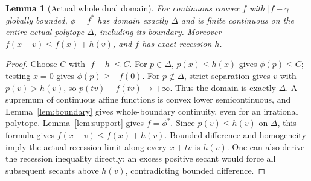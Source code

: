 \documentclass[11pt]{article}
\newtheorem{lemma}[theorem]{Lemma}
\begin{document}
\begin{lemma}[Actual whole dual domain]\label{lem:dual}
For continuous convex $f$ with $|f-\gamma|$ globally bounded, $\phi=f^*$ has domain exactly $\Delta$ and is finite continuous on the entire actual polytope $\Delta$, including its boundary. Moreover $f(x+v)\leq f(x)+h(v)$, and $f$ has exact recession $h$.
\end{lemma}
\begin{proof}
Choose $C$ with $|f-h|\leq C$. For $p\in\Delta$, $p(x)\leq h(x)$ gives $\phi(p)\leq C$; testing $x=0$ gives $\phi(p)\geq-f(0)$. For $p\notin\Delta$, strict separation gives $v$ with $p(v)>h(v)$, so $p(tv)-f(tv)\to+\infty$. Thus the domain is exactly $\Delta$. A supremum of continuous affine functions is convex lower semicontinuous, and Lemma~\ref{lem:boundary} gives whole-boundary continuity, even for an irrational polytope. Lemma~\ref{lem:support} gives $f=\phi^*$. Since $p(v)\leq h(v)$ on $\Delta$, this formula gives $f(x+v)\leq f(x)+h(v)$. Bounded difference and homogeneity imply the actual recession limit along every $x+tv$ is $h(v)$. One can also derive the recession inequality directly: an excess positive secant would force all subsequent secants above $h(v)$, contradicting bounded difference.
\end{proof}
\end{document}

